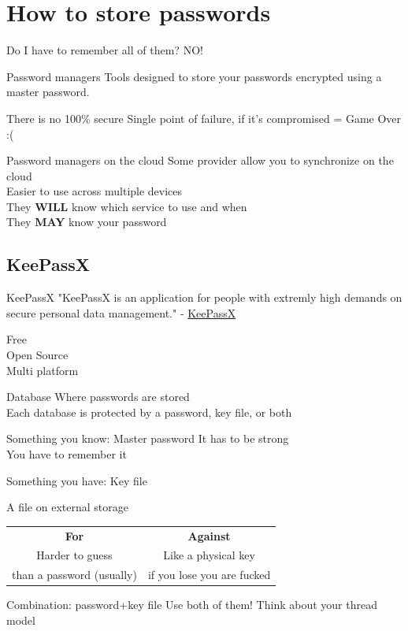 \documentclass[11pt]{beamer}
\begin{document}
\section{How to store passwords}
\begin{frame}{Do I have to remember all of them?}
NO!
\end{frame}
\begin{frame}{Password managers}
Tools designed to store your passwords encrypted using a master password.
\end{frame}
\begin{frame}{There is no 100\% secure}
Single point of failure, if it's compromised  = Game Over :(
\end{frame}
\begin{frame}{Password managers on the cloud}
Some provider allow you to synchronize on the cloud\\
Easier to use across multiple devices\\
They \textbf{WILL} know which service to use and when\\
They \textbf{MAY} know your password
\end{frame}
\subsection{KeePassX}
\begin{frame}{KeePassX}
"KeePassX is an application for people with extremly high demands on secure personal data management." - \href{https://www.keepassx.org/}{KeePassX}\\
\begin{center}
Free\\
Open Source\\
Multi platform
\end{center}
\end{frame}
\begin{frame}{Database}
Where passwords are stored\\
Each database is protected by a password, key file, or both
\end{frame}
\begin{frame}{Something you know: Master password}
It has to be strong\\
You have to remember it
\end{frame}
\begin{frame}{Something you have: Key file}
\begin{center}
A file on external storage\\
\begin{tabular}{cc}
\\
\textbf{For} & \textbf{Against} \\
Harder to guess & Like a physical key\\
than a password (usually)&if you lose you are fucked\\ 
\end{tabular}
\end{center}
\end{frame}
\begin{frame}{Combination: password+key file}
Use both of them!
Think about your thread model
\end{frame}
\end{document}

